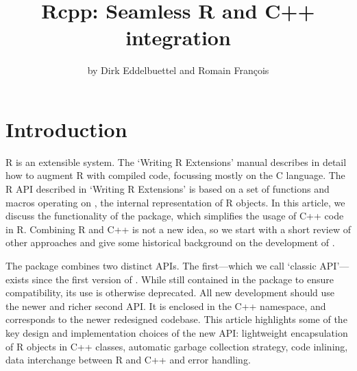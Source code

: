 
\title{Rcpp: Seamless R and C++ integration}
\author{by Dirk Eddelbuettel and Romain Fran\c{c}ois}

\maketitle


\section{Introduction} 

R is an extensible system. The `Writing R Extensions' manual \citep{R:exts}
describes in detail how to augment R with compiled code,
focussing mostly on the C language. The R API described in `Writing R Extensions' is
based on a set of functions and macros operating on , the internal
representation of R objects.
%
In this article, we discuss the functionality of the 
package, which simplifies the usage of C++ code
in R. Combining R and C++ is not a new idea, so we start with
a short review of other approaches and give some historical
background on the development of .


The  package combines two distinct
APIs. The first---which we call `classic  API'---exists since 
the first version of . While still contained in the package to
ensure compatibility, its use is otherwise deprecated. All new development should
use the newer and richer second API. It is enclosed in the  C++ 
namespace, and corresponds to the newer redesigned codebase. 
%
This article highlights some of the key design and implementation choices of
the new API: lightweight encapsulation of R objects in C++ classes, automatic
garbage collection strategy, code inlining, data interchange between R and
C++ and error handling.

